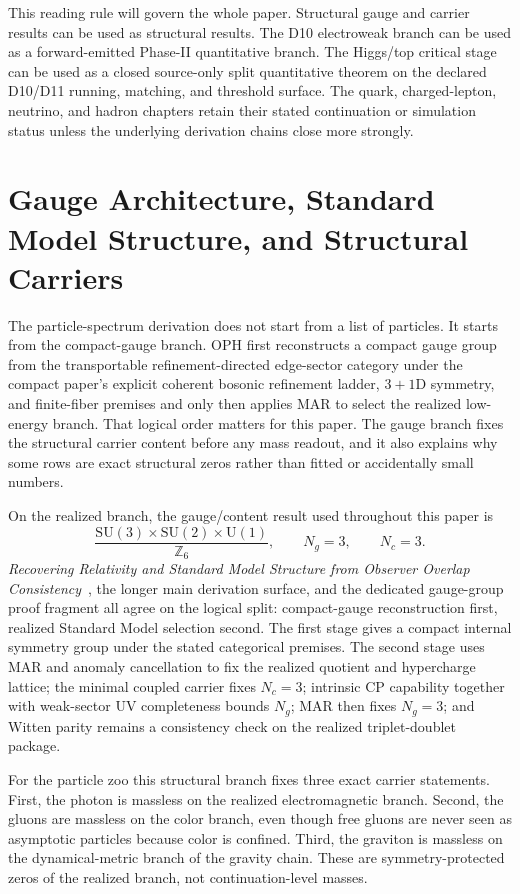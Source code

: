 \documentclass[11pt]{article}
\newcommand{\SU}{\mathrm{SU}}
\newcommand{\U}{\mathrm{U}}
\begin{document}
This reading rule will govern the whole paper. Structural gauge and carrier results can be used
as structural results. The D10 electroweak branch can be used as a forward-emitted Phase-II
quantitative branch. The
Higgs/top critical stage can be used as a closed source-only split quantitative theorem on the declared D10/D11 running, matching, and threshold surface. The quark,
charged-lepton, neutrino, and hadron chapters retain their stated continuation or
simulation status unless the underlying derivation chains close more strongly.

\section{Gauge Architecture, Standard Model Structure, and Structural Carriers}

The particle-spectrum derivation does not start from a list of particles. It starts from the
compact-gauge branch. OPH first reconstructs a compact gauge
group from the transportable refinement-directed edge-sector category under the compact paper's
explicit coherent bosonic refinement ladder, \(3+1\)D symmetry, and finite-fiber premises and only then applies MAR to
select the realized low-energy branch. That logical order matters for this paper. The
gauge branch fixes the structural carrier content before any mass readout, and it also explains
why some rows are exact structural zeros rather than fitted or accidentally small numbers.

On the realized branch, the gauge/content result used throughout this paper is
\[
\frac{\SU(3)\times\SU(2)\times\U(1)}{\mathbb Z_6},
\qquad
N_g=3,
\qquad
N_c=3.
\]
\emph{Recovering Relativity and Standard Model Structure from Observer Overlap Consistency}~\cite{ophcompact}, the longer main derivation surface, and the dedicated gauge-group proof
fragment all agree on the logical split: compact-gauge reconstruction first, realized Standard
Model selection second. The first stage gives a compact internal symmetry group under the stated
categorical premises. The second stage uses MAR and anomaly cancellation to fix the realized
quotient and hypercharge lattice; the minimal coupled carrier fixes \(N_c=3\); intrinsic CP
capability together with weak-sector UV completeness bounds \(N_g\); MAR then fixes \(N_g=3\);
and Witten parity remains a consistency check on the realized triplet-doublet package.

For the particle zoo this structural branch fixes three exact carrier statements.
First, the photon is massless on the realized electromagnetic branch. Second, the gluons are
massless on the color branch, even though free gluons are never seen as asymptotic particles
because color is confined. Third, the graviton is massless on the dynamical-metric branch of the
gravity chain. These are symmetry-protected zeros of the realized branch, not continuation-level
masses.
\end{document}
